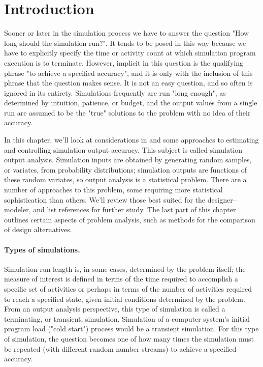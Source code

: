 \setcounter{chapter}{4}
\setcounter{section}{0}
\label{chap:output-problem-analysis}

\section{Introduction}
\label{sec:output-introduction}

Sooner or later in the simulation process we have to answer the question
"How long should the simulation run?". It tends to be posed in this way
because we have to explicitly specify the time or activity count at which
simulation program execution is to terminate. However, implicit in this
question is the qualifying phrase "to achieve a specified accuracy", and it is
only with the inclusion of this phrase that the question makes sense. It is not
an easy question, and so often is ignored in its entirety. Simulations
frequently are run "long enough", as determined by intuition, patience, or
budget, and the output values from a single run are assumed to be the "true"
solutions to the problem with no idea of their accuracy.

In this chapter, we'll look at considerations in and some approaches to
estimating and controlling simulation output accuracy. This subject is called
simulation output analysis. Simulation inputs are obtained by generating
random samples, or variates, from probability distributions; simulation
outputs are functions of these random variates, so output analysis is a
statistical problem. There are a number of approaches to this problem, some
requiring more statistical sophistication than others. We'll review those
best suited for the designer--modeler, and list references for further study.
The last part of this chapter outlines certain aspects of problem analysis,
such as methods for the comparison of design alternatives.

\paragraph{Types of simulations.}
Simulation run length is, in some cases, determined by the problem itself; the
measure of interest is defined in terms of the time required to accomplish a
specific set of activities or perhaps in terms of the number of activities
required to reach a specified state, given initial conditions determined by the
problem. From an output analysis perspective, this type of simulation is called
a terminating, or transient, simulation. Simulation of a computer system's
initial program load ("cold start") process 
\noindent would be a transient simulation.
For this type of simulation, the question becomes one of how many times the
simulation must be repeated (with different random number streams) to achieve
a specified accuracy.

